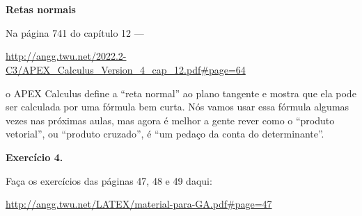 \documentclass[oneside,12pt]{article}
\begin{document}
\def\SELA{\ga{sela 5x5} \;\;\;\;\;\;}

\hspace{-0.5cm}
$\scalebox{0.85}{$
 \begin{array}{ccc}
 \SELA & \SELA & \SELA \\ \\[5pt]
 \SELA & \SELA & \SELA \\
 \end{array}
 $}
$

\newpage


{\bf Retas normais}

Na página 741 do capítulo 12 ---

\ssk

{\scriptsize

\url{http://angg.twu.net/2022.2-C3/APEX_Calculus_Version_4_cap_12.pdf\#page=64}

}

\ssk

o APEX Calculus define a ``reta normal'' ao plano tangente e mostra
que ela pode ser calculada por uma fórmula bem curta. Nós vamos usar
essa fórmula algumas vezes nas próximas aulas, mas agora é melhor a
gente rever como o ``produto vetorial'', ou ``produto cruzado'', é
``um pedaço da conta do determinante''.

\bsk


{\bf Exercício 4.}

Faça os exercícios das páginas 47, 48 e 49 daqui:


\ssk

{\footnotesize

\url{http://angg.twu.net/LATEX/material-para-GA.pdf#page=47}

}
\end{document}
